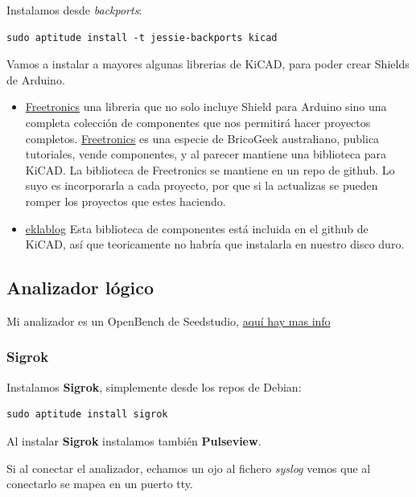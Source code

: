 \documentclass[12pt,spanish,]{scrartcl}
\providecommand{\tightlist}{%
  \setlength{\itemsep}{0pt}\setlength{\parskip}{0pt}}
\begin{document}
Instalamos desde \emph{backports}:

\begin{verbatim}
sudo aptitude install -t jessie-backports kicad
\end{verbatim}

Vamos a instalar a mayores algunas librerias de KiCAD, para poder crear
Shields de Arduino.

\begin{itemize}
\tightlist
\item
  \href{https://github.com/freetronics/freetronics_kicad_library}{Freetronics}
  una libreria que no solo incluye Shield para Arduino sino una completa
  colección de componentes que nos permitirá hacer proyectos completos.
  \href{http://www.freetronics.com}{Freetronics} es una especie de
  BricoGeek australiano, publica tutoriales, vende componentes, y al
  parecer mantiene una biblioteca para KiCAD. La biblioteca de
  Freetronics se mantiene en un repo de github. Lo suyo es incorporarla
  a cada proyecto, por que si la actualizas se pueden romper los
  proyectos que estes haciendo.
\item
  \href{http://meta-blog.eklablog.com/kicad-librairie-arduino-pretty-p930786}{eklablog}
  Esta biblioteca de componentes está incluida en el github de KiCAD,
  así que teoricamente no habría que instalarla en nuestro disco duro.
\end{itemize}

\subsection{Analizador lógico}\label{analizador-luxf3gico}

Mi analizador es un OpenBench de Seedstudio,
\href{http://dangerousprototypes.com/docs/Open_Bench_Logic_Sniffer}{aquí
hay mas info}

\subsubsection{Sigrok}\label{sigrok}

Instalamos \textbf{Sigrok}, simplemente desde los repos de Debian:

\begin{verbatim}
sudo aptitude install sigrok
\end{verbatim}

Al instalar \textbf{Sigrok} instalamos también \textbf{Pulseview}.

Si al conectar el analizador, echamos un ojo al fichero \emph{syslog}
vemos que al conectarlo se mapea en un puerto tty.
\end{document}
